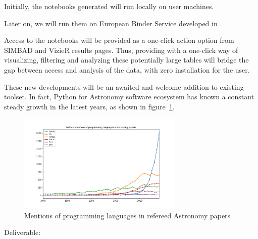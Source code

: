 \begin{task}[
  title=Astronomy application,
  id=astro,
  lead=CDS,
  PM=18,
  wphases={0-48},
  partners={CDS}
]
  Initially, the notebooks generated will run locally on user
  machines.

  Later on, we will run them on European Binder Service developed in .

  Access to the notebooks will be provided as a one-click action option from
  SIMBAD and VizieR results pages.
  Thus, providing with a one-click way of visualizing, filtering and analyzing
these potentially large tables will bridge the gap between access and analysis
of the data, with zero installation for the user.

  These new developments will be an awaited and welcome addition to existing
  toolset. In fact, Python for Astronomy software ecosystem has known a constant
    steady growth in the latest years, as shown in figure~\ref{fig:python-astro-citations}.

  \begin{figure}[ht]\centering
  \includegraphics[width=0.7\textwidth]{tasks/python-astro-citations.png}
  \caption{Mentions of programming languages in refereed Astronomy papers}\label{fig:python-astro-citations}
\end{figure}

Deliverable: 




\end{task}
